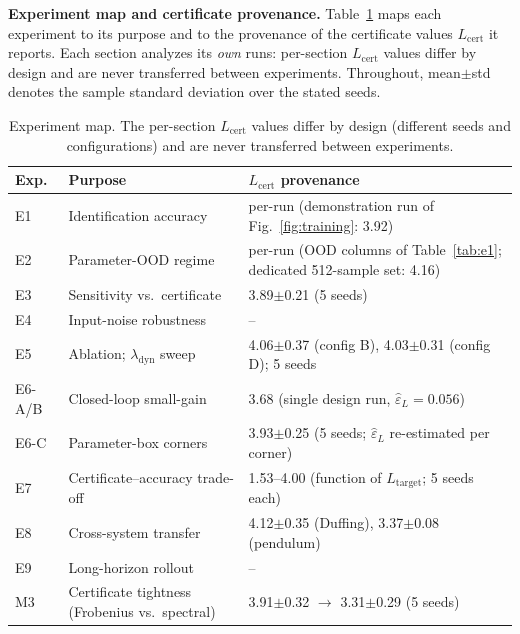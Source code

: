 \documentclass[11pt]{article}
\newcommand{\Lhat}{L_{\mathrm{cert}}}
\newcommand{\epsL}{\varepsilon_L}
\newcommand{\Ltarget}{L_{\mathrm{target}}}
\begin{document}
\textbf{Experiment map and certificate provenance.}
Table~\ref{tab:emap} maps each experiment to its purpose and to the
provenance of the certificate values $\Lhat$ it reports. Each section
analyzes its \emph{own} runs: per-section $\Lhat$ values differ by design and
are never transferred between experiments. Throughout, mean$\pm$std denotes the
sample standard deviation over the stated seeds.

\begin{table}[t]
\centering\small
\caption{Experiment map. The per-section $\Lhat$ values differ by design
(different seeds and configurations) and are never transferred between
experiments.}
\label{tab:emap}
\begin{tabular}{llp{5.4cm}}
\toprule
Exp. & Purpose & $\Lhat$ provenance \\
\midrule
E1 & Identification accuracy & per-run (demonstration run of Fig.~\ref{fig:training}: 3.92) \\
E2 & Parameter-OOD regime & per-run (OOD columns of Table~\ref{tab:e1}; dedicated 512-sample set: 4.16) \\
E3 & Sensitivity vs.\ certificate & 3.89$\pm$0.21 (5 seeds) \\
E4 & Input-noise robustness & -- \\
E5 & Ablation; $\lambda_{\mathrm{dyn}}$ sweep & 4.06$\pm$0.37 (config B), 4.03$\pm$0.31 (config D); 5 seeds \\
E6-A/B & Closed-loop small-gain & 3.68 (single design run, $\hat\epsL=0.056$) \\
E6-C & Parameter-box corners & 3.93$\pm$0.25 (5 seeds; $\hat\epsL$ re-estimated per corner) \\
E7 & Certificate--accuracy trade-off & 1.53--4.00 (function of $\Ltarget$; 5 seeds each) \\
E8 & Cross-system transfer & 4.12$\pm$0.35 (Duffing), 3.37$\pm$0.08 (pendulum) \\
E9 & Long-horizon rollout & -- \\
M3 & Certificate tightness (Frobenius vs.\ spectral) & 3.91$\pm$0.32 $\to$ 3.31$\pm$0.29 (5 seeds) \\
\bottomrule
\end{tabular}
\end{table}
\end{document}
